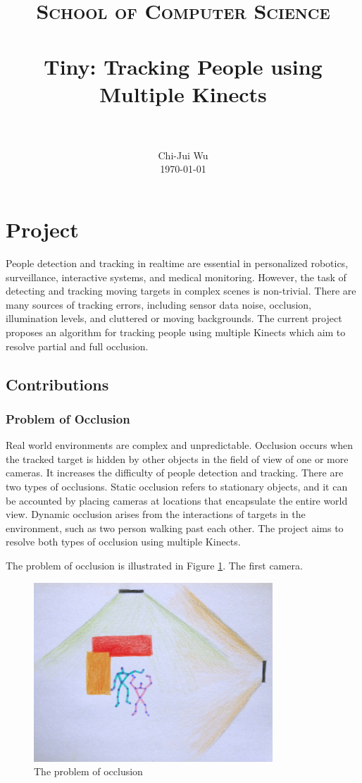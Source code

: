 \documentclass[paper=a4, fontsize=11pt]{scrartcl}
\title{
		\usefont{OT1}{bch}{b}{n}
		\normalfont \normalsize \textsc{School of Computer Science} \\ [25pt]
		\horrule{0.5pt} \\[0.4cm]
		\huge Tiny: Tracking People using Multiple Kinects \\
		\horrule{2pt} \\[0.5cm]
}
\author{
		\normalfont 								\normalsize
        Chi-Jui Wu\\[-3pt]		\normalsize
        \today
}
\date{}
\numberwithin{equation}{section}		%
\numberwithin{figure}{section}			%
\numberwithin{table}{section}				%
\begin{document}
\maketitle

\section{Project}

People detection and tracking in realtime are essential in personalized robotics, surveillance, interactive systems, and medical monitoring. However, the task of detecting and tracking moving targets in complex scenes is non-trivial. There are many sources of tracking errors, including sensor data noise, occlusion, illumination levels, and cluttered or moving backgrounds. The current project proposes an algorithm for tracking people using multiple Kinects which aim to resolve partial and full occlusion.

\subsection{Contributions}

\subsubsection{Problem of Occlusion}

Real world environments are complex and unpredictable. Occlusion occurs when the tracked target is hidden by other objects in the field of view of one or more cameras. It increases the difficulty of people detection and tracking. There are two types of occlusions. Static occlusion refers to stationary objects, and it can be accounted by placing cameras at locations that encapsulate the entire world view. Dynamic occlusion arises from the interactions of targets in the environment, such as two person walking past each other. The project aims to resolve both types of occlusion using multiple Kinects. 

The problem of occlusion is illustrated in Figure \ref{fig:occlusion_problem}. The first camera.

\begin{figure}
	\centering
    \includegraphics[width=0.8\textwidth]{occlusion}
    \caption{The problem of occlusion}
    \label{fig:occlusion_problem}
\end{figure}
\end{document}
